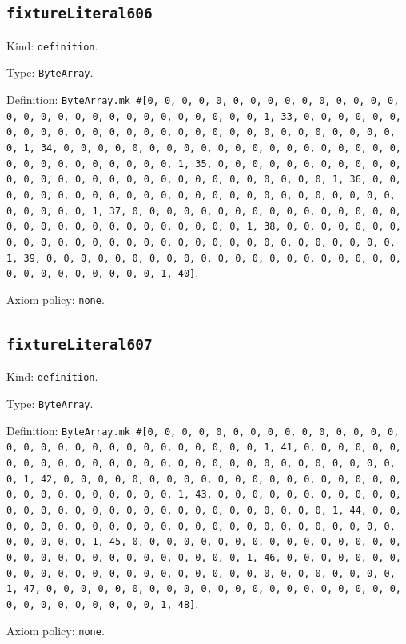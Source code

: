 \documentclass[11pt]{article}
\begin{document}
\subsection*{\texttt{fixtureLiteral606}}
\noindent Kind: \texttt{definition}.\par
\noindent Type: \texttt{ByteArray}.\par
\noindent Definition: \texttt{ByteArray.mk \#[0, 0, 0, 0, 0, 0, 0, 0, 0, 0, 0, 0, 0, 0, 0, 0, 0, 0, 0, 0, 0, 0, 0, 0, 0, 0, 0, 0, 0, 0, 1, 33, 0, 0, 0, 0, 0, 0, 0, 0, 0, 0, 0, 0, 0, 0, 0, 0, 0, 0, 0, 0, 0, 0, 0, 0, 0, 0, 0, 0, 0, 0, 1, 34, 0, 0, 0, 0, 0, 0, 0, 0, 0, 0, 0, 0, 0, 0, 0, 0, 0, 0, 0, 0, 0, 0, 0, 0, 0, 0, 0, 0, 0, 0, 1, 35, 0, 0, 0, 0, 0, 0, 0, 0, 0, 0, 0, 0, 0, 0, 0, 0, 0, 0, 0, 0, 0, 0, 0, 0, 0, 0, 0, 0, 0, 0, 1, 36, 0, 0, 0, 0, 0, 0, 0, 0, 0, 0, 0, 0, 0, 0, 0, 0, 0, 0, 0, 0, 0, 0, 0, 0, 0, 0, 0, 0, 0, 0, 1, 37, 0, 0, 0, 0, 0, 0, 0, 0, 0, 0, 0, 0, 0, 0, 0, 0, 0, 0, 0, 0, 0, 0, 0, 0, 0, 0, 0, 0, 0, 0, 1, 38, 0, 0, 0, 0, 0, 0, 0, 0, 0, 0, 0, 0, 0, 0, 0, 0, 0, 0, 0, 0, 0, 0, 0, 0, 0, 0, 0, 0, 0, 0, 1, 39, 0, 0, 0, 0, 0, 0, 0, 0, 0, 0, 0, 0, 0, 0, 0, 0, 0, 0, 0, 0, 0, 0, 0, 0, 0, 0, 0, 0, 0, 0, 1, 40]}.\par
\noindent Axiom policy: \texttt{none}.\par
\subsection*{\texttt{fixtureLiteral607}}
\noindent Kind: \texttt{definition}.\par
\noindent Type: \texttt{ByteArray}.\par
\noindent Definition: \texttt{ByteArray.mk \#[0, 0, 0, 0, 0, 0, 0, 0, 0, 0, 0, 0, 0, 0, 0, 0, 0, 0, 0, 0, 0, 0, 0, 0, 0, 0, 0, 0, 0, 0, 1, 41, 0, 0, 0, 0, 0, 0, 0, 0, 0, 0, 0, 0, 0, 0, 0, 0, 0, 0, 0, 0, 0, 0, 0, 0, 0, 0, 0, 0, 0, 0, 1, 42, 0, 0, 0, 0, 0, 0, 0, 0, 0, 0, 0, 0, 0, 0, 0, 0, 0, 0, 0, 0, 0, 0, 0, 0, 0, 0, 0, 0, 0, 0, 1, 43, 0, 0, 0, 0, 0, 0, 0, 0, 0, 0, 0, 0, 0, 0, 0, 0, 0, 0, 0, 0, 0, 0, 0, 0, 0, 0, 0, 0, 0, 0, 1, 44, 0, 0, 0, 0, 0, 0, 0, 0, 0, 0, 0, 0, 0, 0, 0, 0, 0, 0, 0, 0, 0, 0, 0, 0, 0, 0, 0, 0, 0, 0, 1, 45, 0, 0, 0, 0, 0, 0, 0, 0, 0, 0, 0, 0, 0, 0, 0, 0, 0, 0, 0, 0, 0, 0, 0, 0, 0, 0, 0, 0, 0, 0, 1, 46, 0, 0, 0, 0, 0, 0, 0, 0, 0, 0, 0, 0, 0, 0, 0, 0, 0, 0, 0, 0, 0, 0, 0, 0, 0, 0, 0, 0, 0, 0, 1, 47, 0, 0, 0, 0, 0, 0, 0, 0, 0, 0, 0, 0, 0, 0, 0, 0, 0, 0, 0, 0, 0, 0, 0, 0, 0, 0, 0, 0, 0, 0, 1, 48]}.\par
\noindent Axiom policy: \texttt{none}.\par
\end{document}
